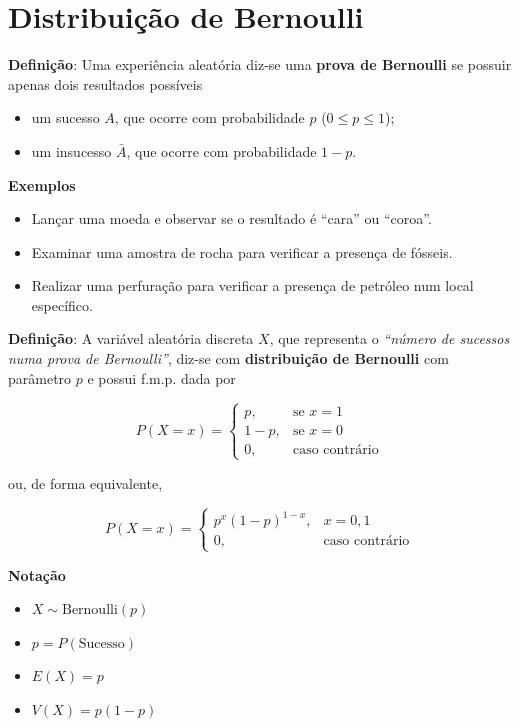 \documentclass[
]{book}
\providecommand{\tightlist}{%
  \setlength{\itemsep}{0pt}\setlength{\parskip}{0pt}}
\begin{document}
\section{Distribuição de Bernoulli}\label{distribuiuxe7uxe3o-de-bernoulli}

\textbf{Definição}: Uma experiência aleatória diz-se uma \textbf{prova de Bernoulli} se possuir apenas dois resultados possíveis

\begin{itemize}
\item
  um sucesso \(A\), que ocorre com probabilidade \(p\) (\(0\leq p \leq 1\));
\item
  um insucesso \(\bar{A}\), que ocorre com probabilidade \(1-p\).
\end{itemize}

\textbf{Exemplos}

\begin{itemize}
\tightlist
\item
  Lançar uma moeda e observar se o resultado é ``cara'' ou ``coroa''.
\item
  Examinar uma amostra de rocha para verificar a presença de fósseis.
\item
  Realizar uma perfuração para verificar a presença de petróleo num local específico.
\end{itemize}

\textbf{Definição}: A variável aleatória discreta \(X\), que representa o \emph{``número de sucessos numa prova de Bernoulli''}, diz-se com \textbf{distribuição de Bernoulli} com parâmetro \(p\) e possui f.m.p. dada por

\[
P(X = x) = 
\begin{cases} 
p, & \text{se } x = 1 \\ 
1 - p, & \text{se } x = 0 \\ 
0, & \text{caso contrário}
\end{cases}
\]

ou, de forma equivalente,

\[
P(X = x) = \begin{cases} p^x (1 - p)^{1 - x}, & x = 0, 1 \\ 0, & \text{caso contrário} \end{cases}
\]

\textbf{Notação}

\begin{itemize}
\tightlist
\item
  \(X \sim \text{Bernoulli}(p)\)
\item
  \(p = P(\text{Sucesso})\)
\item
  \(E(X) = p\)
\item
  \(V(X) = p(1 - p)\)
\end{itemize}
\end{document}
